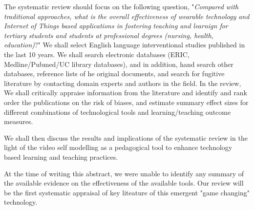 The systematic review should focus on the following question, "\textit{Compared with traditional approaches, what is the overall effectiveness of wearable technology and Internet of Things based applications in fostering teaching and learnign for tertiary students and students at professional degrees (nursing, health, education)}?" We shall select English language interventional studies published in the last 10 years. We shall search electronic databases (ERIC, Medline/Pubmed/UC library databases), and in addition,  hand search other databases, reference lists of he original documents, and search for fugitive literature by contacting domain experts and authors in the field. In the review, We shall critically appraise information from the literature and identify and rank order the publications on the risk of biases, and estimate summary effect sizes for different combinations of technological tools and learning/teaching outcome measures. 

We shall then discuss the results and implications of the systematic review in the light of the video self modelling as a pedagogical tool to enhance technology based learning and teaching practices. 

At the time of writing this abstract, we were unable to identify any summary of the available evidence on the effectiveness of the available tools. Our review will be the first systematic appraisal of key liteature of this emergent "game changing" technology. 
